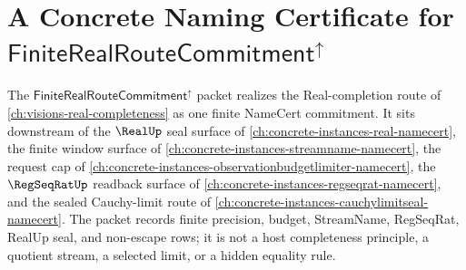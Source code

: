 \chapter{A Concrete Naming Certificate for $\mathsf{FiniteRealRouteCommitment}^{\uparrow}$}
\label{ch:concrete-instances-finite-real-route-commitment-namecert}

The $\mathsf{FiniteRealRouteCommitment}^{\uparrow}$ packet realizes the Real-completion route of \autoref{ch:visions-real-completeness} as one finite NameCert commitment. It sits downstream of the $\RealUp$ seal surface of \autoref{ch:concrete-instances-real-namecert}, the finite window surface of \autoref{ch:concrete-instances-streamname-namecert}, the request cap of \autoref{ch:concrete-instances-observationbudgetlimiter-namecert}, the $\RegSeqRatUp$ readback surface of \autoref{ch:concrete-instances-regseqrat-namecert}, and the sealed Cauchy-limit route of \autoref{ch:concrete-instances-cauchylimitseal-namecert}. The packet records finite precision, budget, StreamName, RegSeqRat, RealUp seal, and non-escape rows; it is not a host completeness principle, a quotient stream, a selected limit, or a hidden equality rule.

